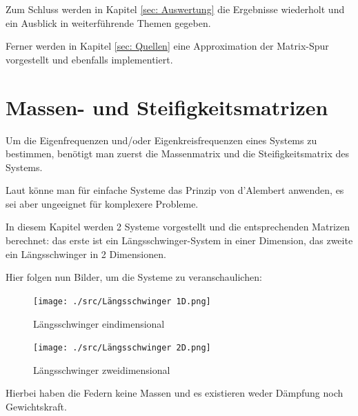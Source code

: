 \documentclass[ngerman,BCOR=4mm]{tudscrreprt}
\theoremstyle{plain} %
\theoremstyle{definition} %
\theoremstyle{remark}
\begin{document}
      Zum Schluss werden in Kapitel \ref{sec: Auswertung} die Ergebnisse wiederholt und ein Ausblick in weiterführende Themen gegeben.

      Ferner werden in Kapitel \ref{sec: Quellen} eine Approximation der Matrix-Spur vorgestellt und ebenfalls implementiert.

\chapter{Massen- und Steifigkeitsmatrizen}
\label{sec: MS Matrizen}
      Um die Eigenfrequenzen und/oder Eigenkreisfrequenzen \w eines Systems zu bestimmen, benötigt man zuerst die Massenmatrix \M und die Steifigkeitsmatrix \K des Systems.

      Laut \cite[S. 366]{maschinendynamikDresig} könne man für einfache Systeme das Prinzip von d'Alembert anwenden, es sei aber ungeeignet für komplexere Probleme.
            
      In diesem Kapitel werden 2 Systeme vorgestellt und die entsprechenden Matrizen berechnet:
      das erste ist ein Längsschwinger-System in einer Dimension, das zweite ein Längsschwinger in 2 Dimensionen.

      Hier folgen nun Bilder, um die Systeme zu veranschaulichen:

      \begin{figure}[ht]
            \centering
            \begin{minipage}[ht]{0.49\linewidth}
                  \centering
                  \texttt{[image: ./src/Längsschwinger 1D.png]}
                  \caption{Längsschwinger eindimensional}
                  \label{fig: Längsschwinger 1d}
            \end{minipage}
            \hfill
            \begin{minipage}[ht]{0.49\linewidth}
                  \centering
                  \texttt{[image: ./src/Längsschwinger 2D.png]}
                  \caption{Längsschwinger zweidimensional}
                  \label{fig: Längsschwinger 2d}
            \end{minipage}
      \end{figure}

      Hierbei haben die Federn keine Massen und es existieren weder Dämpfung noch Gewichtskraft.
\end{document}
